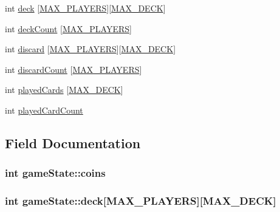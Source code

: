 \begin{DoxyCompactItemize}
\item 
int \hyperlink{structgameState_aaef89485124c6bde73db4fb62d39934d}{deck} \mbox{[}\hyperlink{dominion_8h_a1c346c944e8204fd06dc057393c7c96d}{M\+A\+X\+\_\+\+P\+L\+A\+Y\+E\+RS}\mbox{]}\mbox{[}\hyperlink{dominion_8h_aceaf636cf7440c6002adf9bc0f33c625}{M\+A\+X\+\_\+\+D\+E\+CK}\mbox{]}
\item 
int \hyperlink{structgameState_a43504879689095a8e4c6d8ae00d20d6d}{deck\+Count} \mbox{[}\hyperlink{dominion_8h_a1c346c944e8204fd06dc057393c7c96d}{M\+A\+X\+\_\+\+P\+L\+A\+Y\+E\+RS}\mbox{]}
\item 
int \hyperlink{structgameState_acf66c1bd51ef3e11bbe7f6f4a828d123}{discard} \mbox{[}\hyperlink{dominion_8h_a1c346c944e8204fd06dc057393c7c96d}{M\+A\+X\+\_\+\+P\+L\+A\+Y\+E\+RS}\mbox{]}\mbox{[}\hyperlink{dominion_8h_aceaf636cf7440c6002adf9bc0f33c625}{M\+A\+X\+\_\+\+D\+E\+CK}\mbox{]}
\item 
int \hyperlink{structgameState_abfab9c8927a85b14ffdb70b742fb7583}{discard\+Count} \mbox{[}\hyperlink{dominion_8h_a1c346c944e8204fd06dc057393c7c96d}{M\+A\+X\+\_\+\+P\+L\+A\+Y\+E\+RS}\mbox{]}
\item 
int \hyperlink{structgameState_a31bece00d0036b01ad930cb3581ec5fc}{played\+Cards} \mbox{[}\hyperlink{dominion_8h_aceaf636cf7440c6002adf9bc0f33c625}{M\+A\+X\+\_\+\+D\+E\+CK}\mbox{]}
\item 
int \hyperlink{structgameState_a816527ad4b6efdeb01c22af8887556b3}{played\+Card\+Count}
\end{DoxyCompactItemize}


\subsection{Field Documentation}
\subsubsection[{\texorpdfstring{coins}{coins}}]{\setlength{\rightskip}{0pt plus 5cm}int game\+State\+::coins}\hypertarget{structgameState_a47452bbc9e46dd4fdb4e81f7795c9fa0}{}\label{structgameState_a47452bbc9e46dd4fdb4e81f7795c9fa0}
\subsubsection[{\texorpdfstring{deck}{deck}}]{\setlength{\rightskip}{0pt plus 5cm}int game\+State\+::deck\mbox{[}{\bf M\+A\+X\+\_\+\+P\+L\+A\+Y\+E\+RS}\mbox{]}\mbox{[}{\bf M\+A\+X\+\_\+\+D\+E\+CK}\mbox{]}}\hypertarget{structgameState_aaef89485124c6bde73db4fb62d39934d}{}\label{structgameState_aaef89485124c6bde73db4fb62d39934d}

